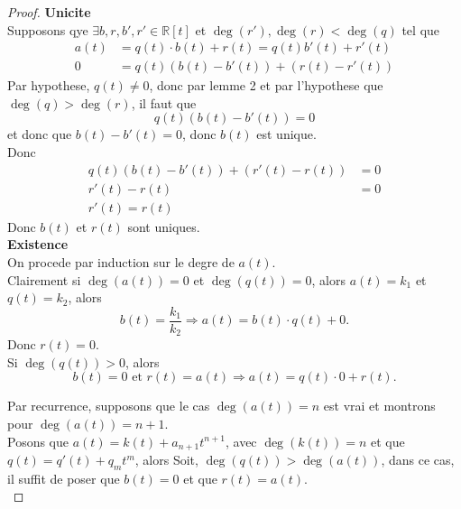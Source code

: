 \documentclass[11pt, a4paper, twoside]{article}
\begin{document}
\begin{proof}
\textbf{Unicite}\\
Supposons qye $\exists b,r,b',r' \in \mathbb{R}[t]$ et $\deg(r'),\deg(r) < \deg(q)$ tel que
\begin{align*}
	a(t) &= q(t) \cdot b(t) + r(t) = q(t) b'(t) + r'(t)\\
	0 &= q(t)(b(t) - b'(t)) + ( r(t) - r'(t)) 
\end{align*}
Par hypothese, $q(t) \neq 0$, donc par lemme 2 et par l'hypothese que $\deg(q) > \deg(r)$, il faut que
\[ 
	q(t)(b(t) - b'(t)) = 0
\]
et donc que $b(t) - b'(t) = 0$, donc $b(t)$ est unique.\\
Donc 
\begin{align*}
	q(t)(b(t) - b'(t)) + ( r'(t) - r(t)) &=0\\
	r'(t) - r(t) &= 0\\
	r'(t) = r(t)
\end{align*}
Donc $b(t)$ et $r(t)$ sont uniques.\\

\textbf{Existence}\\
On procede par induction sur le degre de $a(t)$.\\
Clairement si $\deg(a(t))=0$ et $\deg(q(t))=0$, alors $a(t) = k_1$ et $q(t) = k_2$, alors
\[ 
	b(t) = \frac{k_1}{k_2} \Rightarrow a(t) = b(t) \cdot q(t) + 0
.\]
Donc $r(t)=0$.\\
Si $\deg(q(t))> 0$, alors
\[ 
	b(t) = 0  \text{ et } r(t) = a(t) \Rightarrow  a(t) = q(t) \cdot 0 + r(t)
.\]

Par recurrence, supposons que le cas $\deg(a(t))=n$ est vrai et montrons pour $\deg(a(t))=n+1$.\\
Posons que $a(t)=k(t) + a_{n+1} t^{n+1}$, avec $\deg(k(t))=n$ et que $q(t) = q'(t) + q_m t^{m}$, alors
Soit, $\deg(q(t)) > \deg(a(t))$, dans ce cas, il suffit de poser que $b(t) = 0$ et que $r(t)= a(t)$.\\


\end{proof}
\end{document}
